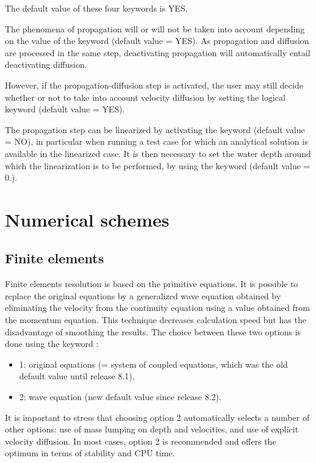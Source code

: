 The default value of these four keywords is YES.

The phenomena of propagation will or will not be taken into account depending
on the value of the keyword  (default value = YES).
As propagation and diffusion are processed in the same step,
deactivating propagation will automatically entail deactivating diffusion.

However, if the propagation-diffusion step is activated, the user may still
decide whether or not to take into account velocity diffusion by setting
the logical keyword  (default value = YES).

The propagation step can be linearized by activating the keyword
 (default value = NO), in particular when running
a test case for which an analytical solution is available in the linearized case.
It is then necessary to set the water depth around which the
linearization is to be performed, by using the keyword
 (default value = 0.).


\section{Numerical schemes}

\subsection{Finite elements}
Finite elements resolution is based on the primitive equations.
It is possible to replace the original equations by a generalized wave equation
obtained by eliminating the velocity from the continuity equation using a value
obtained from the momentum equation.
This technique decreases calculation speed but has the disadvantage
of smoothing the results.
The choice between these two options is done using the keyword
:
\begin{itemize}
\item 1: original equations (= system of coupled equations,
which was the old default value until release 8.1),
\item 2: wave equation (new default value since release 8.2).
\end{itemize}
It is important to stress that choosing option 2 automatically selects
a number of other options:
use of mass lumping on depth and velocities, and use of explicit velocity
diffusion.
In most cases, option 2 is recommended and offers the optimum in terms of
stability and CPU time.

